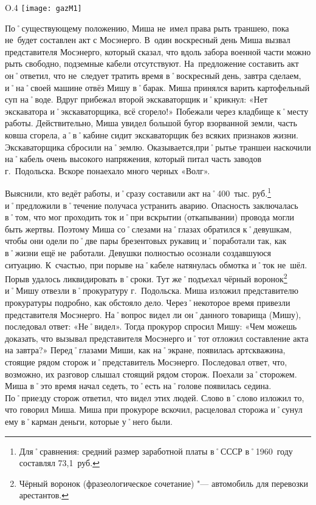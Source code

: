 \begin{wrapfigure}{O}{.4\textwidth}
\centering
\texttt{[image: gazM1]}
\caption[Чёрный воронок. Автомобиль ГАЗ-М\=/1 в˚Музее отечественной военной истории]{Чёрный воронок. Автомобиль ГАЗ-М\=/1 в˚Музее отечественной военной истории\footnotemark}
\label{fig:gazM1}
\end{wrapfigure}

По˚существующему положению, Миша не~имел права рыть траншею, пока не~будет составлен акт с Мосэнерго. В~один воскресный день Миша вызвал представителя Мосэнерго, который сказал, что вдоль забора военной части можно рыть свободно, подземные кабели отсутствуют. На~предложение составить акт он˚ответил, что не~следует тратить время в˚воскресный день, завтра сделаем, и˚на˚своей машине отвёз Мишу в˚барак. Миша принялся варить картофельный суп на˚воде. Вдруг прибежал второй экскаваторщик и˚крикнул: «Нет экскаватора и˚экскаваторщика, всё сгорело!» Побежали через кладбище к˚месту работы. Действительно, Миша увидел большой бугор взорванной земли, часть ковша сгорела, а˚в˚кабине сидит экскаваторщик без всяких признаков жизни. Экскаваторщика сбросили на˚землю. Оказывается,при˚рытье траншеи наскочили на˚кабель очень высокого напряжения, который питал часть заводов г.~Подольска. Вскоре понаехало много черных «Волг». 

Выяснили, кто ведёт работы, и˚сразу составили акт на˚400~тыс. руб.\footnote{Для˚сравнения: средний размер заработной платы в˚СССР в˚1960~году составлял 73,1~руб.} и˚предложили в˚течение получаса устранить аварию. Опасность заключалась в˚том, что мог проходить ток и˚при вскрытии (откапывании) провода могли быть жертвы. Поэтому Миша со˚слезами на˚глазах обратился к˚девушкам, чтобы они одели по˚две пары брезентовых рукавиц и˚поработали так, как в˚жизни ещё не~работали. Девушки полностью осознали создавшуюся ситуацию. К~счастью, при порыве на˚кабеле натянулась обмотка и˚ток не~шёл. Порыв удалось ликвидировать в˚сроки. Тут же˚подъехал чёрный воронок\footnote{Чёрный воронок (фразеологическое сочетание) "--- автомобиль для перевозки арестантов.} и˚Мишу отвезли в˚прокуратуру г.~Подольска. Миша изложил представителю прокуратуры подробно, как обстояло дело. Через˚некоторое время привезли представителя Мосэнерго. На˚вопрос видел ли он˚данного товарища (Мишу), последовал ответ: «Не˚видел». Тогда прокурор спросил Мишу: «Чем можешь доказать, что вызывал представителя Мосэнерго и˚тот отложил составление акта на завтра?» 
Перед˚глазами Миши, как на˚экране, появилась артскважина, стоящие рядом сторож и˚представитель Мосэнерго. Последовал ответ, что, возможно, их разговор слышал стоящий рядом сторож. Поехали за˚сторожем. Миша в˚это время начал седеть, то˚есть на˚голове появилась седина. По˚приезду сторож ответил, что видел этих людей. Слово в˚слово изложил то, что говорил Миша. Миша при прокуроре вскочил, расцеловал сторожа и˚сунул ему в˚карман деньги, которые у˚него были.

